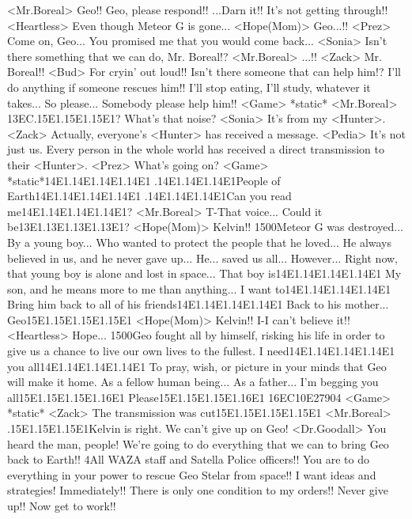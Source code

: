 <Mr.Boreal> Geo!! Geo, please respond!! 
...Darn it!! It's not getting through!! 
<Heartless> Even though Meteor G is gone... 
<Hope(Mom)> Geo...!! 
<Prez> Come on, Geo... 
You promised me that you would come back... 
<Sonia> Isn't there something that we can do, Mr. Boreal!? 
<Mr.Boreal> ...!! 
<Zack> Mr. Boreal!! 
<Bud> For cryin' out loud!! 
Isn't there someone that can help him!? 
I'll do anything if someone rescues him!! 
I'll stop eating, I'll study, whatever it takes... 
So please... 
Somebody please help him!! 
<Game> *static* 
<Mr.Boreal> {13}{EC}.{15}{E1}.{15}{E1}.{15}{E1}? 
What's that noise? 
<Sonia> It's from my <Hunter>. 
<Zack> Actually, everyone's <Hunter> has received a message. 
<Pedia> It's not just us. 
Every person in the whole world has received a direct transmission to their <Hunter>. 
<Prez> What's going on? 
<Game> *static*{14}{E1}.{14}{E1}.{14}{E1}.{14}{E1} 
.{14}{E1}.{14}{E1}.{14}{E1}People of Earth{14}{E1}.{14}{E1}.{14}{E1}.{14}{E1} 
.{14}{E1}.{14}{E1}.{14}{E1}Can you read me{14}{E1}.{14}{E1}.{14}{E1}.{14}{E1}? 
<Mr.Boreal> T-That voice... Could it be{13}{E1}.{13}{E1}.{13}{E1}.{13}{E1}? 
<Hope(Mom)> Kelvin!! 
{15}{00}Meteor G was destroyed... 
By a young boy... 
Who wanted to protect the people that he loved... 
He always believed in us, and he never gave up... He... saved us all... 
However... Right now, that young boy is alone and lost in space... 
That boy is{14}{E1}.{14}{E1}.{14}{E1}.{14}{E1} 
My son, and he means more to me than anything... I want to{14}{E1}.{14}{E1}.{14}{E1}.{14}{E1} 
Bring him back to all of his friends{14}{E1}.{14}{E1}.{14}{E1}.{14}{E1} 
Back to his mother... Geo{15}{E1}.{15}{E1}.{15}{E1}.{15}{E1} 
<Hope(Mom)> Kelvin!! 
I-I can't believe it!! 
<Heartless> Hope... 
{15}{00}Geo fought all by himself, risking his life in order to 
give us a chance to live our own lives to the fullest. 
I need{14}{E1}.{14}{E1}.{14}{E1}.{14}{E1} you all{14}{E1}.{14}{E1}.{14}{E1}.{14}{E1} 
To pray, wish, or picture in your minds that Geo will make it home. 
As a fellow human being... 
As a father... 
I'm begging you all{15}{E1}.{15}{E1}.{15}{E1}.{16}{E1} 
Please{15}{E1}.{15}{E1}.{15}{E1}.{16}{E1} 
{16}{EC}{10}{E2}{79}{04} 
<Game> *static* 
<Zack> The transmission was cut{15}{E1}.{15}{E1}.{15}{E1}.{15}{E1} 
<Mr.Boreal> .{15}{E1}.{15}{E1}.{15}{E1}Kelvin is right. We can't give up on Geo! 
<Dr.Goodall> You heard the man, people! 
We're going to do everything that we can to bring Geo back to Earth!! 
4All WAZA staff and Satella Police officers!! 
You are to do everything in your power to rescue Geo Stelar from space!! 
I want ideas and strategies! Immediately!! 
There is only one condition to my orders!! 
Never give up!! 
Now get to work!! 
